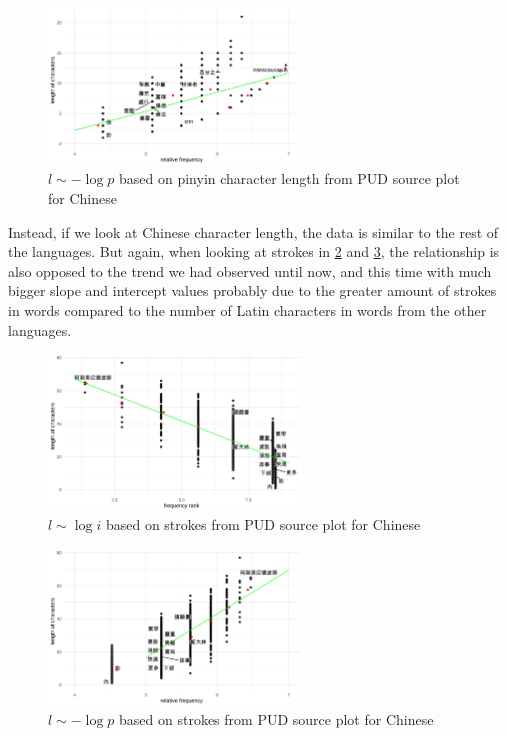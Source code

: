 \begin{figure}[H]
    \centering
    \includegraphics[width=0.6\textwidth]{plots/Chinese_logp_cl_PUD_pinyin.pdf}
    \caption{$l \sim -\log p$ based on pinyin character length from PUD source plot for Chinese}
    \label{chinese_logp_cl_PUD_pinyin}
\end{figure}

Instead, if we look at Chinese character length, the data is similar to the rest of the languages. But again, when looking at strokes in \cref{chinese_logi_cl_PUD_strokes} and \cref{chinese_logp_cl_PUD_strokes}, the relationship is also opposed to the trend we had observed until now, and this time with much bigger slope and intercept values probably due to the greater amount of strokes in words compared to the number of Latin characters in words from the other languages.

\begin{figure}[H]
    \centering
    \includegraphics[width=0.6\textwidth]{plots/Chinese_logi_cl_PUD_strokes.pdf}
    \caption{$l \sim \log i$ based on strokes from PUD source plot for Chinese}
    \label{chinese_logi_cl_PUD_strokes}
\end{figure}

\begin{figure}[H]
    \centering
    \includegraphics[width=0.6\textwidth]{plots/Chinese_logp_cl_PUD_strokes.pdf}
    \caption{$l \sim -\log p$ based on strokes from PUD source plot for Chinese}
    \label{chinese_logp_cl_PUD_strokes}
\end{figure}

